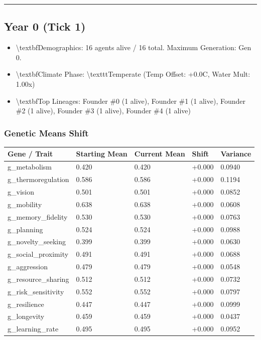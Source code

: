 \documentclass[11pt,a4paper]{article}
\begin{document}
\noindent\rule{\textwidth}{0.4pt}

\subsection*{ Year 0 (Tick 1)}
\begin{itemize}
  \item \textbackslash{}textbf{Demographics:} 16 agents alive / 16 total. Maximum Generation: Gen 0.
  \item \textbackslash{}textbf{Climate Phase:} \textbackslash{}texttt{Temperate} (Temp Offset: +0.0C, Water Mult: 1.00x)
  \item \textbackslash{}textbf{Top Lineages:} Founder \#0 (1 alive), Founder \#1 (1 alive), Founder \#2 (1 alive), Founder \#3 (1 alive), Founder \#4 (1 alive)
\end{itemize}

\subsubsection*{ Genetic Means Shift}
\begin{longtable}{lllll}
\toprule
Gene / Trait & Starting Mean & Current Mean & Shift & Variance \\
\midrule
\endhead
g\_metabolism & 0.420 & 0.420 & +0.000 & 0.0940 \\
g\_thermoregulation & 0.586 & 0.586 & +0.000 & 0.1194 \\
g\_vision & 0.501 & 0.501 & +0.000 & 0.0852 \\
g\_mobility & 0.638 & 0.638 & +0.000 & 0.0608 \\
g\_memory\_fidelity & 0.530 & 0.530 & +0.000 & 0.0763 \\
g\_planning & 0.524 & 0.524 & +0.000 & 0.0988 \\
g\_novelty\_seeking & 0.399 & 0.399 & +0.000 & 0.0630 \\
g\_social\_proximity & 0.491 & 0.491 & +0.000 & 0.0688 \\
g\_aggression & 0.479 & 0.479 & +0.000 & 0.0548 \\
g\_resource\_sharing & 0.512 & 0.512 & +0.000 & 0.0732 \\
g\_risk\_sensitivity & 0.552 & 0.552 & +0.000 & 0.0797 \\
g\_resilience & 0.447 & 0.447 & +0.000 & 0.0999 \\
g\_longevity & 0.459 & 0.459 & +0.000 & 0.0437 \\
g\_learning\_rate & 0.495 & 0.495 & +0.000 & 0.0952 \\
\bottomrule
\end{longtable}
\end{document}
